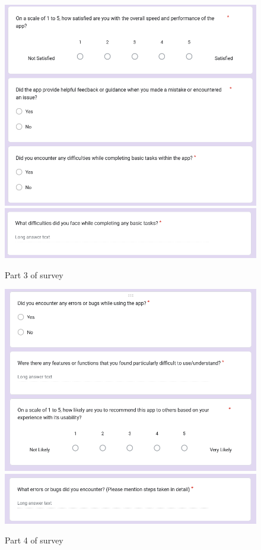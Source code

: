 \documentclass[12pt, titlepage]{article}
\begin{document}
\begin{figure}[H]
    \centering
    \includegraphics[width=1\linewidth]{survey_part_3.png}
    \includegraphics[width=1\linewidth]{survey_part_3_5.png}
    \caption{Part 3 of survey}
    \label{fig:pt3}
\end{figure}

\begin{figure}[H]
    \centering
    \includegraphics[width=1\linewidth]{survey_part_4.png}
    \includegraphics[width=1\linewidth]{survey_part_4_5.png}
    \caption{Part 4 of survey}
    \label{fig:pt4}
\end{figure}
\end{document}
